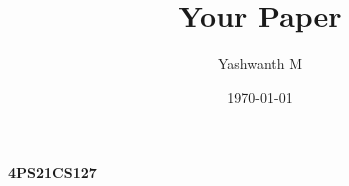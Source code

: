 \documentclass{article}
\title{Your Paper}
\author{Yashwanth M}  %
\date{\today}
\begin{document}
\maketitle

\textbf{4PS21CS127}  %
  

\end{document}
